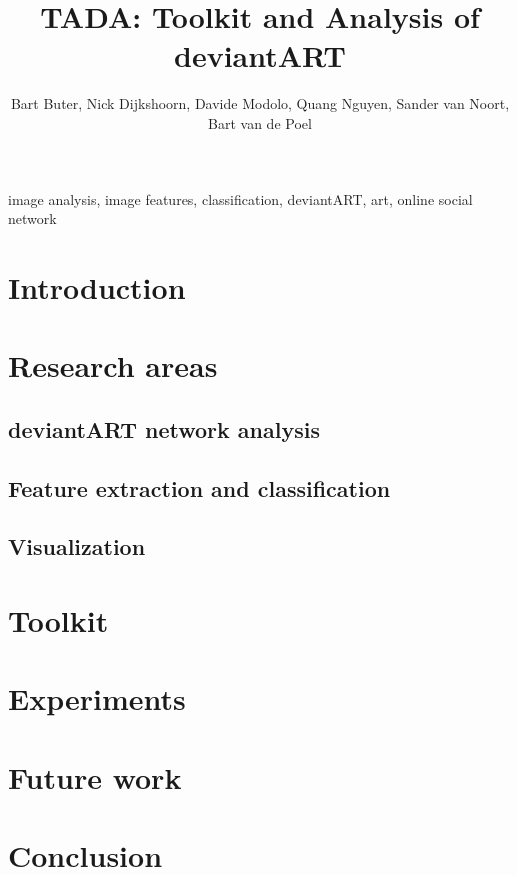 \documentclass[10pt,journal,compsoc]{IEEEtran}
\begin{document}
\title{TADA: Toolkit and Analysis of deviantART}
\author{Bart Buter, Nick Dijkshoorn, Davide Modolo, Quang Nguyen, Sander van Noort, Bart van de Poel}

\maketitle

\begin{abstract}

\end{abstract}


\begin{keywords}
image analysis, image features, classification, deviantART, art, online social network
\end{keywords}


\section{Introduction \label{intro}}



\section{Research areas \label{research_area}}
	\subsection{deviantART network analysis \label{net}}
	
	\subsection{Feature extraction and classification \label {feat_class}}
	
	\subsection{Visualization \label{visualiz}}
	


\section{Toolkit \label{toolkit}}


\section{Experiments \label{exp}}



\section{Future work \label{future_work}}


\section{Conclusion \label{conclusion}}


%




\pagebreak
\tableofcontents
\end{document}
